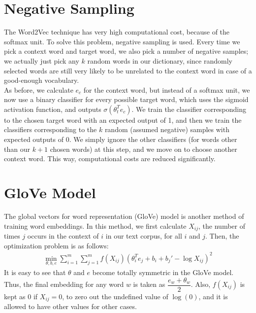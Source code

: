 \documentclass[a4paper, 12pt]{report}
\begin{document}
\section{Negative Sampling}
The Word2Vec technique has very high computational cost, because of the softmax unit. To solve this problem, negative sampling is used. Every time we pick a context word and target word, we also pick a number of negative samples; we actually just pick any $k$ random words in our dictionary, since randomly selected words are still very likely to be unrelated to the context word in case of a good-enough vocabulary.\\
\break
As before, we calculate $e_c$ for the context word, but instead of a softmax unit, we now use a binary classifier for every possible target word, which uses the sigmoid activation function, and outputs $\sigma(\theta_t^T e_c)$. We train the classifier corresponding to the chosen target word with an expected output of 1, and then we train the classifiers corresponding to the $k$ random (assumed negative) samples with expected outputs of 0. We simply ignore the other classifiers (for words other than our $k+1$ chosen words) at this step, and we move on to choose another context word. This way, computational costs are reduced significantly.

\section{GloVe Model}
The global vectors for word representation (GloVe) model is another method of training word embeddings. In this method, we first calculate $X_{ij}$, the number of times $j$ occurs in the context of $i$ in our text corpus, for all $i$ and $j$. Then, the optimization problem is as follows:
\begin{align*}
\min_{\theta, b, e} \sum_{i=1}^{m}\sum_{j=1}^{m}f(X_{ij})\left(\theta_i^T e_j + b_i + b_j' - \log X_{ij}\right)^2
\end{align*}
It is easy to see that $\theta$ and $e$ become totally symmetric in the GloVe model. Thus, the final embedding for any word $w$ is taken as $\dfrac{e_w + \theta_w}{2}$. Also, $f(X_{ij})$ is kept as 0 if $X_{ij}=0$, to zero out the undefined value of $\log(0)$, and it is allowed to have other values for other cases.
\end{document}
